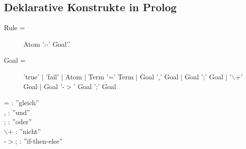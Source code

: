 \documentclass[german, 10pt, a4paper, twocolumn]{scrartcl}
\theoremstyle{definition}
\theoremstyle{remark}
\theoremstyle{example}
\begin{document}
\subsection{Deklarative Konstrukte in Prolog}

\begin{description}
 \item[Rule =] Atom ':-' Goal'.'
 \item[Goal =] 'true' $|$ 'fail' $|$ Atom $|$ Term '=' Term $|$ Goal ',' Goal $|$ Goal ';' Goal $|$ '$\backslash$+' Goal $|$ Goal '-$>$' Goal ';' Goal
\end{description}

= : ''gleich''\\
, : ''und''\\
; : ''oder''\\
$\backslash$+ : ''nicht''\\
-$>$; : ''if-then-else''\\
\end{document}
